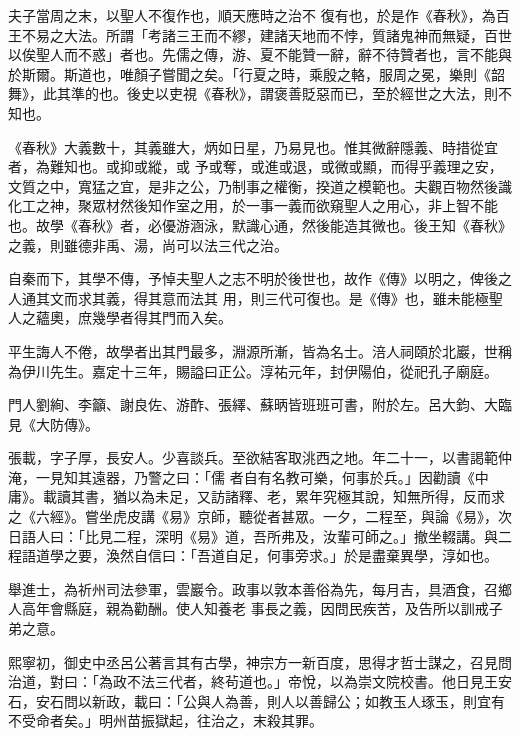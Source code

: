 \begin{pinyinscope}
 夫子當周之末，以聖人不復作也，順天應時之治不
 復有也，於是作《春秋》，為百王不易之大法。所謂「考諸三王而不繆，建諸天地而不悖，質諸鬼神而無疑，百世以俟聖人而不惑」者也。先儒之傳，游、夏不能贊一辭，辭不待贊者也，言不能與於斯爾。斯道也，唯顏子嘗聞之矣。「行夏之時，乘殷之輅，服周之冕，樂則《韶舞》，此其準的也。後史以吏視《春秋》，謂褒善貶惡而已，至於經世之大法，則不知也。



 《春秋》大義數十，其義雖大，炳如日星，乃易見也。惟其微辭隱義、時措從宜者，為難知也。或抑或縱，或
 予或奪，或進或退，或微或顯，而得乎義理之安，文質之中，寬猛之宜，是非之公，乃制事之權衡，揆道之模範也。夫觀百物然後識化工之神，聚眾材然後知作室之用，於一事一義而欲窺聖人之用心，非上智不能也。故學《春秋》者，必優游涵泳，默識心通，然後能造其微也。後王知《春秋》之義，則雖德非禹、湯，尚可以法三代之治。



 自秦而下，其學不傳，予悼夫聖人之志不明於後世也，故作《傳》以明之，俾後之人通其文而求其義，得其意而法其
 用，則三代可復也。是《傳》也，雖未能極聖人之蘊奧，庶幾學者得其門而入矣。



 平生誨人不倦，故學者出其門最多，淵源所漸，皆為名士。涪人祠頤於北巖，世稱為伊川先生。嘉定十三年，賜謚曰正公。淳祐元年，封伊陽伯，從祀孔子廟庭。



 門人劉絢、李籲、謝良佐、游酢、張繹、蘇昞皆班班可書，附於左。呂大鈞、大臨見《大防傳》。



 張載，字子厚，長安人。少喜談兵。至欲結客取洮西之地。年二十一，以書謁範仲淹，一見知其遠器，乃警之曰：「儒
 者自有名教可樂，何事於兵。」因勸讀《中庸》。載讀其書，猶以為未足，又訪諸釋、老，累年究極其說，知無所得，反而求之《六經》。嘗坐虎皮講《易》京師，聽從者甚眾。一夕，二程至，與論《易》，次日語人曰：「比見二程，深明《易》道，吾所弗及，汝輩可師之。」撤坐輟講。與二程語道學之要，渙然自信曰：「吾道自足，何事旁求。」於是盡棄異學，淳如也。



 舉進士，為祈州司法參軍，雲巖令。政事以敦本善俗為先，每月吉，具酒食，召鄉人高年會縣庭，親為勸酬。使人知養老
 事長之義，因問民疾苦，及告所以訓戒子弟之意。



 熙寧初，御史中丞呂公著言其有古學，神宗方一新百度，思得才哲士謀之，召見問治道，對曰：「為政不法三代者，終茍道也。」帝悅，以為崇文院校書。他日見王安石，安石問以新政，載曰：「公與人為善，則人以善歸公；如教玉人琢玉，則宜有不受命者矣。」明州苗振獄起，往治之，末殺其罪。




\end{pinyinscope}
